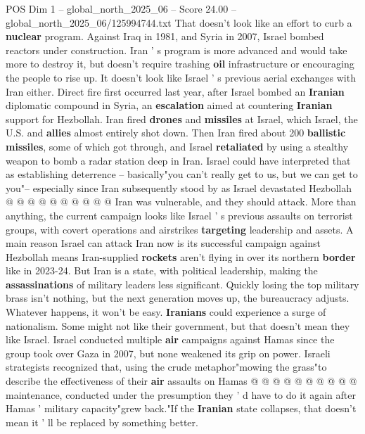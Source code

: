 \begin{textsample}{POS Dim 1 – global\_north\_2025\_06 – Score 24.00 – global\_north\_2025\_06/125994744.txt}  \label{ex:f1_pos_334}
That doesn't look like an effort to curb a \textbf{nuclear} program.
Against Iraq in 1981, and Syria in 2007, Israel bombed reactors under construction.
Iran ' s program is more advanced and would take more to destroy it, but doesn't require trashing \textbf{oil} infrastructure or encouraging the people to rise up.
It doesn't look like Israel ' s previous aerial exchanges with Iran either.
Direct fire first occurred last year, after Israel bombed an \textbf{Iranian} diplomatic compound in Syria, an \textbf{escalation} aimed at countering \textbf{Iranian} support for Hezbollah.
Iran fired \textbf{drones} and \textbf{missiles} at Israel, which Israel, the U.S. and \textbf{allies} almost entirely shot down.
Then Iran fired about 200 \textbf{ballistic} \textbf{missiles}, some of which got through, and Israel \textbf{retaliated} by using a stealthy weapon to bomb a radar station deep in Iran.
Israel could have interpreted that as establishing deterrence -- basically"you can't really get to us, but we can get to you"-- especially since Iran subsequently stood by as Israel devastated Hezbollah @ @ @ @ @ @ @ @ @ @ Iran was vulnerable, and they should attack.
More than anything, the current campaign looks like Israel ' s previous assaults on terrorist groups, with covert operations and airstrikes \textbf{targeting} leadership and assets.
A main reason Israel can attack Iran now is its successful campaign against Hezbollah means Iran-supplied \textbf{rockets} aren't flying in over its northern \textbf{border} like in 2023-24.
But Iran is a state, with political leadership, making the \textbf{assassinations} of military leaders less significant.
Quickly losing the top military brass isn't nothing, but the next generation moves up, the bureaucracy adjusts.
Whatever happens, it won't be easy. \textbf{Iranians} could experience a surge of nationalism.
Some might not like their government, but that doesn't mean they like Israel.
Israel conducted multiple \textbf{air} campaigns against Hamas since the group took over Gaza in 2007, but none weakened its grip on power.
Israeli strategists recognized that, using the crude metaphor"mowing the grass"to describe the effectiveness of their \textbf{air} assaults on Hamas @ @ @ @ @ @ @ @ @ @ maintenance, conducted under the presumption they ' d have to do it again after Hamas ' military capacity"grew back."If the \textbf{Iranian} state collapses, that doesn't mean it ' ll be replaced by something better.

\end{textsample}

